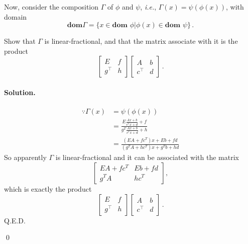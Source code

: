\documentclass[a4paper]{article}
\newenvironment{solution}
{\color{blue} \paragraph{Solution.}}
{\newline \qed}
\begin{document}
Now, consider the composition $\Gamma$ of $\phi$ and $\psi$, \emph{i.e.}, $\Gamma(x)=\psi(\phi(x))$, with domain
\begin{equation}
\textbf{dom} \Gamma = \{ x \in \textbf{dom } \phi | \phi(x) \in \textbf{dom } \psi\} \,.
\end{equation}

Show that $\Gamma$ is linear-fractional, and that the matrix associate with it is the product
\begin{equation}
  \left[\begin{matrix}
   E & f \\
   g^\top & h
  \end{matrix}\right]
  \left[\begin{matrix}
   A & b \\
   c^\top & d
  \end{matrix}\right]\,.
\end{equation}


\begin{solution}
    \begin{equation}
    \begin{split}
        \because \Gamma(x)&=\psi(\phi(x))\\
        &=\frac{E\frac{Ax+b}{c^Tx+d}+f}{g^T\frac{Ax+b}{c^Tx+d}+h}\\
        &=\frac{(EA+fc^T)x+Eb+fd}{(g^TA+hc^T)x+g^Tb+hd}
    \end{split}
    \end{equation}
    So apparently $\Gamma$ is linear-fractional and it can be associated with the matrix
    \begin{equation}
        \left[\begin{matrix}
         EA+fc^T & Eb+fd \\
         g^TA & hc^T
        \end{matrix}\right],
    \end{equation}
    which is exactly the product
    \begin{equation}
        \left[\begin{matrix}
         E & f \\
         g^\top & h
        \end{matrix}\right]
        \left[\begin{matrix}
         A & b \\
         c^\top & d
        \end{matrix}\right]\,.
    \end{equation}
    Q.E.D.

\end{solution}
\end{document}
